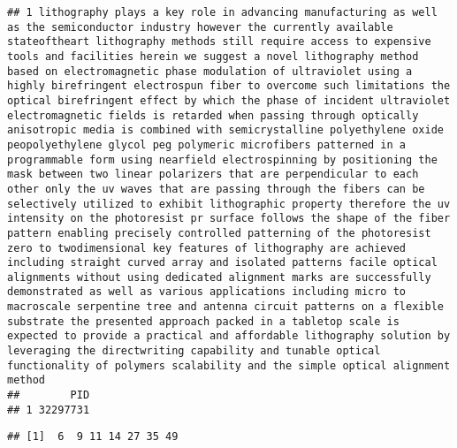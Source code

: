 \documentclass[
  a4paper]{article}
\newenvironment{Shaded}{\begin{snugshade}}{\end{snugshade}}
\newcommand{\CommentTok}[1]{\textcolor[rgb]{0.56,0.35,0.01}{\textit{#1}}}
\newcommand{\KeywordTok}[1]{\textcolor[rgb]{0.13,0.29,0.53}{\textbf{#1}}}
\newcommand{\NormalTok}[1]{#1}
\newcommand{\OperatorTok}[1]{\textcolor[rgb]{0.81,0.36,0.00}{\textbf{#1}}}
\newcommand{\StringTok}[1]{\textcolor[rgb]{0.31,0.60,0.02}{#1}}
\begin{document}
\begin{verbatim}
## 1 lithography plays a key role in advancing manufacturing as well as the semiconductor industry however the currently available stateoftheart lithography methods still require access to expensive tools and facilities herein we suggest a novel lithography method based on electromagnetic phase modulation of ultraviolet using a highly birefringent electrospun fiber to overcome such limitations the optical birefringent effect by which the phase of incident ultraviolet electromagnetic fields is retarded when passing through optically anisotropic media is combined with semicrystalline polyethylene oxide peopolyethylene glycol peg polymeric microfibers patterned in a programmable form using nearfield electrospinning by positioning the mask between two linear polarizers that are perpendicular to each other only the uv waves that are passing through the fibers can be selectively utilized to exhibit lithographic property therefore the uv intensity on the photoresist pr surface follows the shape of the fiber pattern enabling precisely controlled patterning of the photoresist zero to twodimensional key features of lithography are achieved including straight curved array and isolated patterns facile optical alignments without using dedicated alignment marks are successfully demonstrated as well as various applications including micro to macroscale serpentine tree and antenna circuit patterns on a flexible substrate the presented approach packed in a tabletop scale is expected to provide a practical and affordable lithography solution by leveraging the directwriting capability and tunable optical functionality of polymers scalability and the simple optical alignment method
##        PID
## 1 32297731
\end{verbatim}

\begin{Shaded}
\end{Shaded}

\begin{verbatim}
## [1]  6  9 11 14 27 35 49
\end{verbatim}
\end{document}
